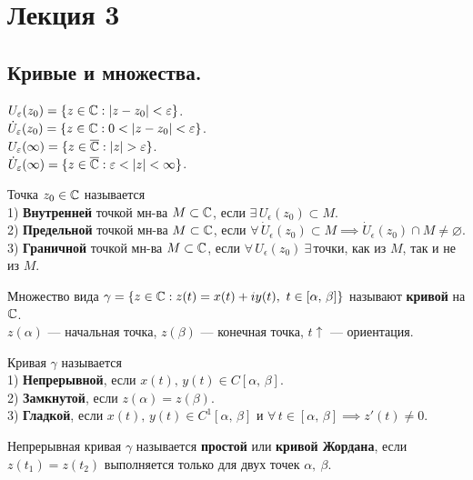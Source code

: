 	\section{Лекция 3}
	\subsection{Кривые и множества.}
	\noindent
	\begin{definition}
		\hspace{-0.94cm}
		$U_\varepsilon(z_0) = \{ z\in\mathbb{C} : |z-z_0|<\varepsilon \}$.\\
		$\dot U_\epsilon(z_0) = \{ z\in\Cm: 0<|z-z_0|<\epsilon \}$.\\
		$U_\epsilon(\infty) = \{ z\in\overline\Cm:|z|>\epsilon \}$.\\
		$\dot U_\epsilon(\infty) = \{ z \in\overline\Cm:\epsilon<|z|<\infty \}$.		
	\end{definition}
	\begin{definition}
		Точка $z_0\in\mathbb{C}$ называется\\
		1)\textbf{ Внутренней} точкой мн-ва $M\subset\mathbb{C}$, если $\exists\, U_\epsilon(z_0)\subset M$.\\
		2)\textbf { Предельной} точкой мн-ва $M\subset\mathbb{C}$, если $\forall\,\dot U_\epsilon(z_0)\subset M\implies\dot U_\epsilon(z_0)\cap M\ne\varnothing$.\\
		3)\textbf { Граничной} точкой мн-ва $M\subset\mathbb{C}$, если $\forall\, U_\epsilon(z_0)\ \exists \,$точки, как из $M$, так и не из $M$.
	\end{definition}
	\begin{definition}
		Множество вида $\gamma =\{z\in\mathbb{C} : z(t)=x(t)+iy(t),\ t\in[\alpha,\,\beta]\}$ называют \textbf{кривой} на $\mathbb{C}$.\\
		$z(\alpha)$ --- начальная точка, $z(\beta)$ --- конечная точка, $t\uparrow$ --- ориентация.
	\end{definition}
	\begin{definition}
		Кривая $\gamma$ называется\\ 
		1) \textbf{Непрерывной}, если $x(t),\,y(t)\in C[\alpha,\,\beta]$.\\
		2) \textbf{Замкнутой}, если $z(\alpha)=z(\beta)$.\\
		3) \textbf{Гладкой}, если $x(t),\,y(t)\in C^1[\alpha,\,\beta]$ и $\forall\,t\in[\alpha,\,\beta]\implies z'(t)\ne0$.
	\end{definition}
	\begin{definition}
		Непрерывная кривая $\gamma$ называется \textbf{простой} или \textbf{кривой Жордана}, если $z(t_1) = z(t_2)$ выполняется только для двух точек $\alpha,\ \beta$.
	\end{definition}
